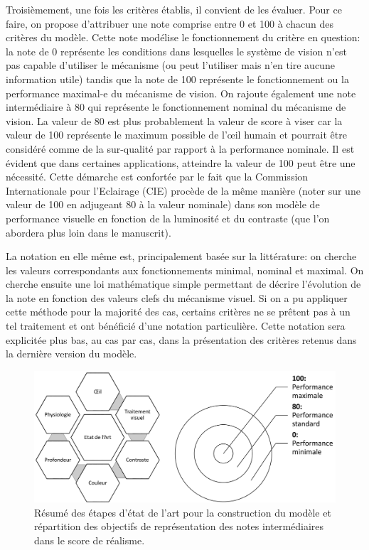 	\par Troisièmement, une fois les critères établis, il convient de les évaluer. Pour ce faire, on propose d'attribuer une note comprise entre 0 et 100 à chacun des critères du modèle. Cette note modélise le fonctionnement du critère en question: la note de 0 représente les conditions dans lesquelles le système de vision n'est pas capable d'utiliser le mécanisme (ou peut l'utiliser mais n'en tire aucune information utile) tandis que la note de 100 représente le fonctionnement ou la performance maximal-e du mécanisme de vision. On rajoute également une note intermédiaire à 80 qui représente le fonctionnement nominal du mécanisme de vision. La valeur de 80 est plus probablement la valeur de score à viser car la valeur de 100 représente le maximum possible de l'œil humain et pourrait être considéré comme de la sur-qualité par rapport à la performance nominale. Il est évident que dans certaines applications, atteindre la valeur de 100 peut être une nécessité. Cette démarche est confortée par le fait que la Commission Internationale pour l'Eclairage (CIE) procède de la même manière (noter sur une valeur de 100 en adjugeant 80 à la valeur nominale) dans son modèle de performance visuelle en fonction de la luminosité et du contraste (que l'on abordera plus loin dans le manuscrit).
	
	\par La notation en elle même est, principalement basée sur la littérature: on cherche les valeurs correspondants aux fonctionnements minimal, nominal et maximal. On cherche ensuite une loi mathématique simple permettant de décrire l'évolution de la note en fonction des valeurs clefs du mécanisme visuel. Si on a pu appliquer cette méthode pour la majorité des cas, certains critères ne se prêtent pas à un tel traitement et ont bénéficié d'une notation particulière. Cette notation sera explicitée plus bas, au cas par cas, dans la présentation des critères retenus dans la dernière version du modèle.
	
	\begin{figure}[h]
		\centering
		\includegraphics[scale=.50]{Figures/EDLAProcessScoreTarget}
		\caption{Résumé des étapes d'état de l'art pour la construction du modèle et répartition des objectifs de représentation des notes intermédiaires dans le score de réalisme.}
		\label{fig:edla_process_score_target}
	\end{figure}
	
